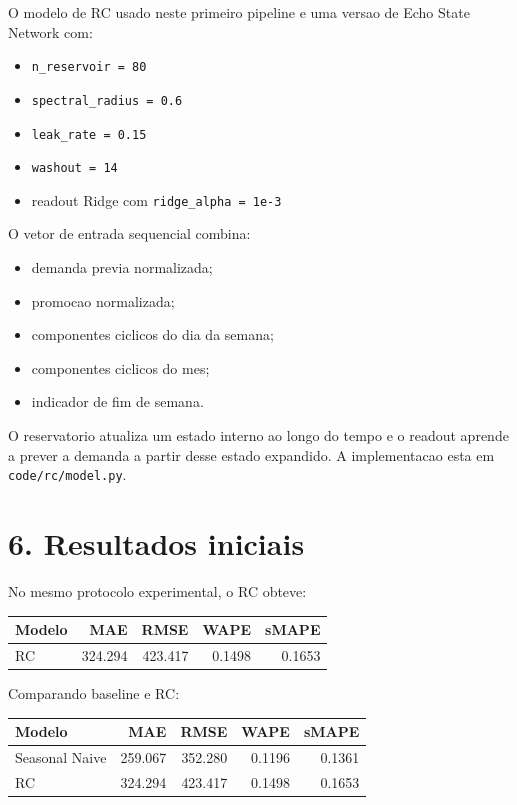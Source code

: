 \documentclass[12pt]{article}
\providecommand{\tightlist}{%
  \setlength{\itemsep}{0pt}\setlength{\parskip}{0pt}}
\begin{document}
O modelo de RC usado neste primeiro pipeline e uma versao de Echo State Network com:

\begin{itemize}
\tightlist
\item
  \texttt{n\_reservoir\ =\ 80}
\item
  \texttt{spectral\_radius\ =\ 0.6}
\item
  \texttt{leak\_rate\ =\ 0.15}
\item
  \texttt{washout\ =\ 14}
\item
  readout Ridge com \texttt{ridge\_alpha\ =\ 1e-3}
\end{itemize}

O vetor de entrada sequencial combina:

\begin{itemize}
\tightlist
\item
  demanda previa normalizada;
\item
  promocao normalizada;
\item
  componentes ciclicos do dia da semana;
\item
  componentes ciclicos do mes;
\item
  indicador de fim de semana.
\end{itemize}

O reservatorio atualiza um estado interno ao longo do tempo e o readout aprende a prever a demanda a partir desse estado expandido. A implementacao esta em \texttt{code/rc/model.py}.

\section{6. Resultados iniciais}\label{6-resultados-iniciais}

No mesmo protocolo experimental, o RC obteve:

\begin{longtable}[]{@{}lrrrr@{}}
\toprule\noalign{}
Modelo & MAE & RMSE & WAPE & sMAPE \\
\midrule\noalign{}
\endhead
\bottomrule\noalign{}
\endlastfoot
RC & 324.294 & 423.417 & 0.1498 & 0.1653 \\
\end{longtable}

Comparando baseline e RC:

\begin{longtable}[]{@{}lrrrr@{}}
\toprule\noalign{}
Modelo & MAE & RMSE & WAPE & sMAPE \\
\midrule\noalign{}
\endhead
\bottomrule\noalign{}
\endlastfoot
Seasonal Naive & 259.067 & 352.280 & 0.1196 & 0.1361 \\
RC & 324.294 & 423.417 & 0.1498 & 0.1653 \\
\end{longtable}
\end{document}

